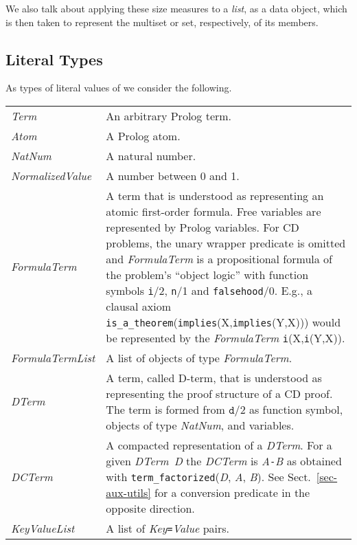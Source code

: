 \documentclass[a4paper,11pt]{article}
\newcommand{\f}[1]{\texttt{#1}}
\newcommand{\lit}[1]{\textnormal{\textit{#1}}}
\begin{document}
We also talk about applying these size measures to a \emph{list}, as a data
object, which is then taken to represent the multiset or set, respectively, of
its members.


\subsection{Literal Types}
\label{sec-literal-types}

As types of literal values of we consider the following.

\begin{longtable}{lL{28em}}
  \lit{Term} & An arbitrary Prolog term.\\
  \lit{Atom} & A Prolog atom.\\
  \lit{NatNum} & A natural number.\\
  \lit{NormalizedValue} & A number between 0 and 1.\\
  \lit{FormulaTerm} & A term that is understood as representing an atomic
  first-order formula. Free variables are represented by Prolog variables. For
  CD problems, the unary wrapper predicate is omitted and \lit{FormulaTerm} is
  a propositional formula of the problem's ``object logic'' with function
  symbols \f{i}/2, \f{n}/1 and \f{falsehood}/0. E.g., a clausal axiom
  \f{is\_a\_theorem}(\f{implies}(X,\f{implies}(Y,X))) would
  be represented by the \lit{FormulaTerm}
  \f{i}(X,\f{i}(Y,X)).\\
  \lit{FormulaTermList} & A list of objects of type \lit{FormulaTerm}.\\
  \lit{DTerm} & A term, called D-term, that is understood as representing the
  proof structure of a CD proof. The term is formed from $\f{d}/2$ as function
  symbol, objects of type
  \lit{NatNum}, and variables.\\
  \lit{DCTerm} & A compacted representation of a \lit{DTerm}. For a given
  \lit{DTerm}~\lit{D} the \lit{DCTerm} is \lit{A}\f{-}\lit{B} as obtained with
  \texttt{term\_factorized}(\lit{D}, \lit{A}, \lit{B}). See
  Sect.~\ref{sec-aux-utils} for a conversion predicate in the opposite
    direction.\\
  \lit{KeyValueList} & A list of \lit{Key}\f{=}\lit{Value} pairs.\\
\end{longtable}
\end{document}
